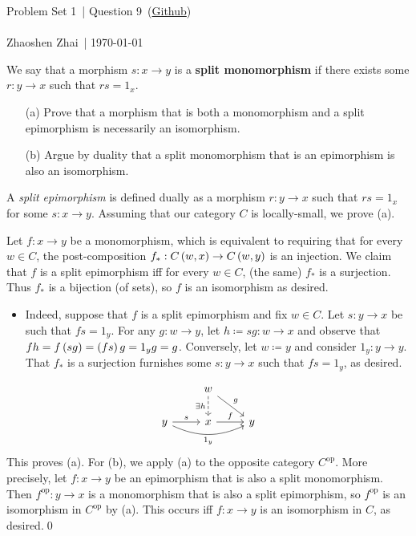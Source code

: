 \documentclass{article}
\begin{document}
    \def\problemSet{1}
    \def\question{9}
    \def\name{Zhaoshen Zhai}

    \begin{center}
        \large{Problem Set \problemSet\ | Question \question\ (\href{https://github.com/zhaoshenzhai/CatTheory-F23}{Github})}\\\ \\
        \normalsize{\name\ | \today}
    \end{center}

    \setcounter{exercise}{\question-1}

    \begin{exercise}
        We say that a morphism $s:x\to y$ is a \textbf{split monomorphism} if there exists some $r:y\to x$ such that $rs=1_x$.
        \begin{itemize}
            \item[(a)] Prove that a morphism that is both a monomorphism and a split epimorphism is necessarily an isomorphism.
            \item[(b)] Argue by duality that a split monomorphism that is an epimorphism is also an isomorphism.
        \end{itemize}
    \end{exercise}
    \begin{solution}
        A \textit{split epimorphism} is defined dually as a morphism $r:y\to x$ such that $rs=1_x$ for some $s:x\to y$. Assuming that our category $C$ is locally-small, we prove (a).
        
        Let $f:x\to y$ be a monomorphism, which is equivalent to requiring that for every $w\in C$, the post-composition $f_\ast:C\left(w,x\right)\to C\left(w,y\right)$ is an injection. We claim that $f$ is a split epimorphism iff for every $w\in C$, (the same) $f_\ast$ is a surjection. Thus $f_\ast$ is a bijection (of sets), so $f$ is an isomorphism as desired.
        \begin{itemize}
            \item Indeed, suppose that $f$ is a split epimorphism and fix $w\in C$. Let $s:y\to x$ be such that $fs=1_y$. For any $g:w\to y$, let $h\coloneqq sg:w\to x$ and observe that $fh=f\left(sg\right)=\left(fs\right)g=1_yg=g$. Conversely, let $w\coloneqq y$ and consider $1_y:y\to y$. That $f_\ast$ is a surjection furnishes some $s:y\to x$ such that $fs=1_y$, as desired.
        \end{itemize}
        \begin{equation*}
            \begin{tikzcd}
                & w \ar[dr, "g"] \ar[d, "\ex h"', dashed] & \\
                y \ar[r, "s"] \ar[rr, "1_y"', bend right=25] & x \ar[r, "f"] & y
            \end{tikzcd}
        \end{equation*}
        This proves (a). For (b), we apply (a) to the opposite category $C^\textrm{op}$. More precisely, let $f:x\to y$ be an epimorphism that is also a split monomorphism. Then $f^\textrm{op}:y\to x$ is a monomorphism that is also a split epimorphism, so $f^\textrm{op}$ is an isomorphism in $C^\textrm{op}$ by (a). This occurs iff $f:x\to y$ is an isomorphism in $C$, as desired.\qed
    \end{solution}
\end{document}

